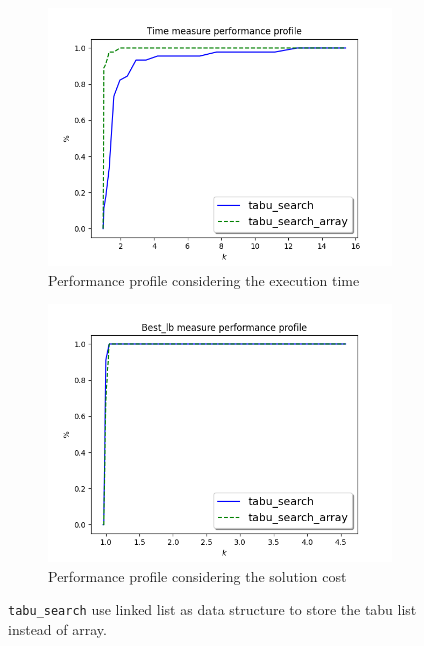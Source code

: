\begin{figure}[!h]
	\centering
	\begin{subfigure}{0.49\columnwidth}
		\centering
		\includegraphics[width=\columnwidth]{../res/Ltabu_LA_time.png}
		\caption{Performance profile considering the execution time}
		\label{fig:tabu_search_diff_perform_time}
	\end{subfigure}
	\hfill
	\begin{subfigure}{0.49\columnwidth}
		\centering
		\includegraphics[width=\columnwidth]{../res/Ltabu_LA_lb.png}
		\caption{Performance profile considering the solution cost}
		\label{fig:tabu_search_diff_perform_lb}
	\end{subfigure}
\caption{\texttt{tabu\_search} use linked list as data structure to store the tabu list instead of array.}
\label{fig:tabu_search_diff_perform}
\end{figure}
